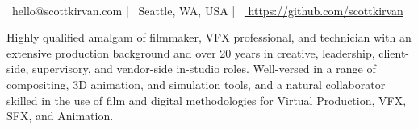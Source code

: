 \documentclass[]{resume-format}
\begin{document}
\begin{center}
      \\
    \vspace{2mm}
    {\faEnvelope\ hello@scottkirvan.com} | {\faMapMarker\ Seattle, WA, USA} | {\faLink\ \href{ https://github.com/scottkirvan }{ https://github.com/scottkirvan }}
\end{center}


\begin{cvpersonalstatement}
  \item { Highly qualified amalgam of filmmaker, VFX professional, and technician with an extensive production background and over 20 years in creative, leadership, client-side, supervisory, and vendor-side in-studio roles. Well-versed in a range of compositing, 3D animation, and simulation tools, and a natural collaborator skilled in the use of film and digital methodologies for Virtual Production, VFX, SFX, and Animation. }
\end{cvpersonalstatement}


\end{document}
